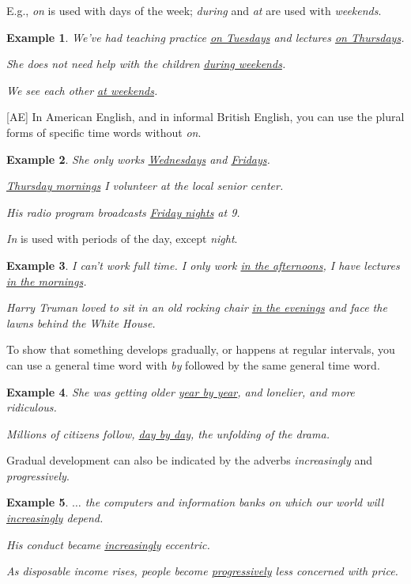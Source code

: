 \documentclass[oneside]{book}
\numberwithin{equation}{section}
\newtheorem{example}{Example}[section]
\begin{document}
E.g., \textit{on} is used with days of the week; \textit{during} and \textit{at} are used with \textit{weekends}.
\begin{example}
    We've had teaching practice \underline{on Tuesdays} and lectures \underline{on Thursdays}.
    
    She does not need help with the children \underline{during weekends}.
    
    We see each other \underline{at weekends}.
\end{example}
%
[AE] In American English, and in informal British English, you can use the plural forms of specific time words without \textit{on}.
\begin{example}
    She only works \underline{Wednesdays} and \underline{Fridays}.
    
    \underline{Thursday mornings} I volunteer at the local senior center.
    
    His radio program broadcasts \underline{Friday nights} at 9.
\end{example}
\textit{In} is used with periods of the day, except \textit{night}.
\begin{example}
    I can't work full time. I only work \underline{in the afternoons}, I have lectures \underline{in the mornings}.
    
    Harry Truman loved to sit in an old rocking chair \underline{in the evenings} and face the lawns behind the White House.
\end{example}
%
\noindent{} To show that something develops gradually, or happens at regular intervals, you can use a general time word with \textit{by} followed by the same general time word.
\begin{example}
    She was getting older \underline{year by year}, and lonelier, and more ridiculous.
    
    Millions of citizens follow, \underline{day by day}, the unfolding of the drama.
\end{example}
Gradual development can also be indicated by the adverbs \textit{increasingly} and \textit{progressively}.
\begin{example}
    $\ldots$ the computers and information banks on which our world will \underline{increasingly} depend.
    
    His conduct became \underline{increasingly} eccentric.
    
    As disposable income rises, people become \underline{progressively} less concerned with price.
\end{example}
\end{document}
